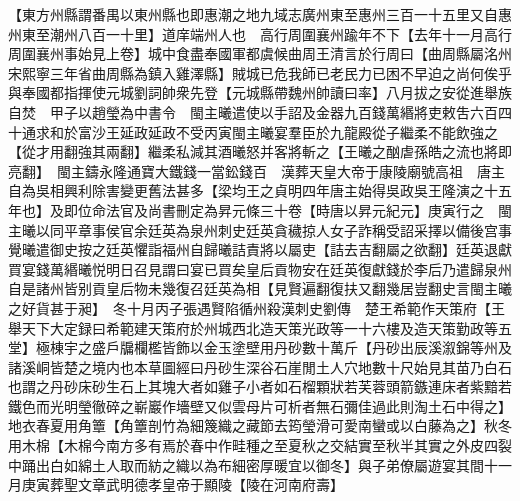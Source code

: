 【東方州縣謂番禺以東州縣也即惠潮之地九域志廣州東至惠州三百一十五里又自惠州東至潮州八百一十里】道庠端州人也　高行周圍襄州踰年不下【去年十一月高行周圍襄州事始見上卷】城中食盡奉國軍都虞候曲周王清言於行周曰【曲周縣屬洺州宋熙寧三年省曲周縣為鎮入雞澤縣】賊城已危我師已老民力已困不早迫之尚何俟乎與奉國都指揮使元城劉詞帥衆先登【元城縣帶魏州帥讀曰率】八月拔之安從進舉族自焚　甲子以趙瑩為中書令　閩主曦遣使以手詔及金器九百錢萬緡將吏敕吿六百四十通求和於富沙王延政延政不受丙寅閩主曦宴羣臣於九龍殿從子繼柔不能飲強之【從才用翻強其兩翻】繼柔私減其酒曦怒并客將斬之【王曦之酗虐孫皓之流也將即亮翻】　閩主鑄永隆通寶大鐵錢一當鈆錢百　漢葬天皇大帝于康陵廟號高祖　唐主自為吳相興利除害變更舊法甚多【梁均王之貞明四年唐主始得吳政吳王隆演之十五年也】及即位命法官及尚書刪定為昇元條三十卷【時唐以昇元紀元】庚寅行之　閩主曦以同平章事侯官余廷英為泉州刺史廷英貪穢掠人女子詐稱受詔采擇以備後宫事覺曦遣御史按之廷英懼詣福州自歸曦詰責將以屬吏【詰去吉翻屬之欲翻】廷英退獻買宴錢萬緡曦悦明日召見謂曰宴已買矣皇后貢物安在廷英復獻錢於李后乃遣歸泉州自是諸州皆别貢皇后物未幾復召廷英為相【見賢遍翻復扶又翻幾居豈翻史言閩主曦之好貨甚于昶】　冬十月丙子張遇賢陷循州殺漢刺史劉傳　楚王希範作天策府【王舉天下大定録曰希範建天策府於州城西北造天策光政等一十六樓及造天策勤政等五堂】極棟宇之盛戶牖欄檻皆飾以金玉塗壁用丹砂數十萬斤【丹砂出辰溪溆錦等州及諸溪峒皆楚之境内也本草圖經曰丹砂生深谷石崖閒土人穴地數十尺始見其苗乃白石也謂之丹砂床砂生石上其塊大者如雞子小者如石榴顆狀若芙蓉頭箭鏃連床者紫黯若鐵色而光明瑩徹碎之嶄巖作墻壁又似雲母片可析者無石彌佳過此則淘土石中得之】地衣春夏用角簟【角簟剖竹為細篾織之藏節去筠瑩滑可愛南蠻或以白藤為之】秋冬用木棉【木棉今南方多有焉於春中作畦種之至夏秋之交結實至秋半其實之外皮四裂中踊出白如綿土人取而紡之織以為布細密厚暖宜以御冬】與子弟僚屬遊宴其間十一月庚寅葬聖文章武明德孝皇帝于顯陵【陵在河南府壽】

